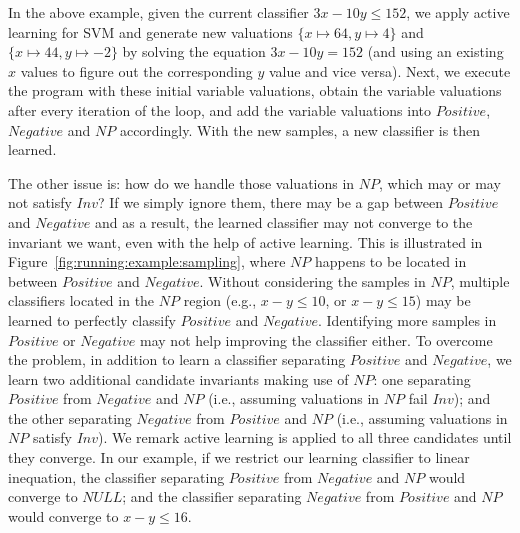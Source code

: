 \begin{example}
In the above example, given the current classifier $3x-10y \leq 152$, we apply active learning for SVM 
and generate new valuations $\{x \mapsto 64, y \mapsto 4\}$ and $\{x \mapsto 44, y \mapsto -2\}$ 
by solving the equation $3x-10y = 152$ (and using an existing $x$ values to figure out the corresponding $y$ value and vice versa). 
Next, we execute the program with these initial variable valuations, obtain the variable valuations after every iteration of the loop, and add the variable valuations into $\mathit{Positive}$, $\mathit{Negative}$ and $\mathit{NP}$ accordingly. 
With the new samples, a new classifier is then learned.
\end{example}
The other issue is: how do we handle those valuations in $\mathit{NP}$, which may or may not satisfy $\mathit{Inv}$? 
If we simply ignore them, there may be a gap between $\mathit{Positive}$ and $\mathit{Negative}$ and as a result, the learned classifier may not converge to the invariant we want, even with the help of active learning. 
This is illustrated in Figure~\ref{fig:running:example:sampling}, where $\mathit{NP}$ happens to be located in between $\mathit{Positive}$ and $\mathit{Negative}$. 
Without considering the samples in $\mathit{NP}$, multiple classifiers located in the $\mathit{NP}$ region (e.g., $x - y \leq 10$, or $x - y \leq 15$) may be learned to perfectly classify $\mathit{Positive}$ and $\mathit{Negative}$. 
Identifying more samples in $\mathit{Positive}$ or $\mathit{Negative}$ may not help improving the classifier either. 
To overcome the problem, in addition to learn a classifier separating $\mathit{Positive}$ and $\mathit{Negative}$, we learn two additional candidate invariants making use of $\mathit{NP}$: 
one separating $\mathit{Positive}$ from $\mathit{Negative}$ and $\mathit{NP}$ (i.e., assuming valuations in $\mathit{NP}$ fail $\mathit{Inv}$); 
and the other separating $\mathit{Negative}$ from $\mathit{Positive}$ and $\mathit{NP}$ (i.e., assuming valuations in $\mathit{NP}$ satisfy $\mathit{Inv}$). 
We remark active learning is applied to all three candidates until they converge. 
In our example, if we restrict our learning classifier to linear inequation, the classifier separating $\mathit{Positive}$ from $\mathit{Negative}$ and $\mathit{NP}$ would converge to $\mathit{NULL}$; %
and the classifier separating $\mathit{Negative}$ from $\mathit{Positive}$ and $\mathit{NP}$ would converge to $x - y \leq 16$.

